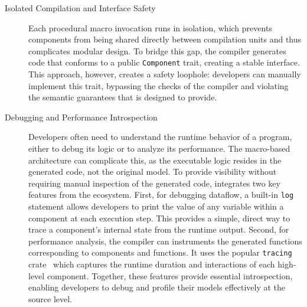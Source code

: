 \begin{description}
    \item[Isolated Compilation and Interface Safety] Each procedural macro invocation runs in
          isolation, which prevents components from being shared directly between compilation
          units and thus complicates modular design. To bridge this gap, the compiler generates
          code that conforms to a public \texttt{Component} trait, creating a stable interface.
          This approach, however, creates a safety loophole: developers can manually implement this
          trait, bypassing the checks of the compiler and violating the semantic guarantees that
          \GRust is designed to provide.


    \item[Debugging and Performance Introspection]
          Developers often need to understand the runtime behavior of a program, either to debug its
          logic or to analyze its performance. The macro-based architecture can complicate this,
          as the executable logic resides in the generated \Rust code, not the original model.
          To provide visibility without requiring manual inspection of the generated code, \GRust
          integrates two key features from the \Rust ecosystem.
          First, for debugging dataflow, a built-in \texttt{log} statement allows developers to
          print the value of any variable within a \GRust component at each execution step.
          This provides a simple, direct way to trace a component's internal state from the
          runtime output.
          Second, for performance analysis, the compiler can instruments the generated \Rust
          functions corresponding to \GRust components and functions. It uses the popular
          \texttt{tracing} crate~\cite{tracing_rust} which captures the runtime duration and
          interactions of each high-level component.
          Together, these features provide essential introspection, enabling developers to debug
          and profile their models effectively at the source level.


\end{description}
